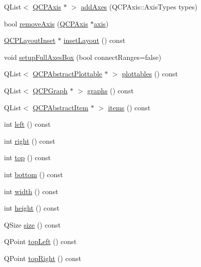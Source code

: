 \begin{DoxyCompactItemize}
\item 
Q\+List$<$ \hyperlink{classQCPAxis}{Q\+C\+P\+Axis} $\ast$ $>$ \hyperlink{classQCPAxisRect_a792e1f3d9cb1591fca135bb0de9b81fc}{add\+Axes} (Q\+C\+P\+Axis\+::\+Axis\+Types types)
\item 
bool \hyperlink{classQCPAxisRect_a03c39cd9704f0d36fb6cf980cdddcbaa}{remove\+Axis} (\hyperlink{classQCPAxis}{Q\+C\+P\+Axis} $\ast$\hyperlink{classQCPAxisRect_a560de44e47a4af0f86c59102a094b1e4}{axis})
\item 
\hyperlink{classQCPLayoutInset}{Q\+C\+P\+Layout\+Inset} $\ast$ \hyperlink{classQCPAxisRect_a4114887c7141b59650b7488f930993e5}{inset\+Layout} () const 
\item 
void \hyperlink{classQCPAxisRect_a5fa906175447b14206954f77fc7f1ef4}{setup\+Full\+Axes\+Box} (bool connect\+Ranges=false)
\item 
Q\+List$<$ \hyperlink{classQCPAbstractPlottable}{Q\+C\+P\+Abstract\+Plottable} $\ast$ $>$ \hyperlink{classQCPAxisRect_a5b0d629c8de5572945eeae79a142296e}{plottables} () const 
\item 
Q\+List$<$ \hyperlink{classQCPGraph}{Q\+C\+P\+Graph} $\ast$ $>$ \hyperlink{classQCPAxisRect_afa4ff90901d9275f670e24b40e3c1b25}{graphs} () const 
\item 
Q\+List$<$ \hyperlink{classQCPAbstractItem}{Q\+C\+P\+Abstract\+Item} $\ast$ $>$ \hyperlink{classQCPAxisRect_a0f17ed539962cfcbaca8ce0b1776c840}{items} () const 
\item 
int \hyperlink{classQCPAxisRect_a55b3ecf72a3a65b053f7651b88db458d}{left} () const 
\item 
int \hyperlink{classQCPAxisRect_a6d0f989fc552aa2b563cf82f8fc81e61}{right} () const 
\item 
int \hyperlink{classQCPAxisRect_ac45aef1eb75cea46b241b6303028a607}{top} () const 
\item 
int \hyperlink{classQCPAxisRect_af2b5982ebe7e6f781b9bf1cc371a60d8}{bottom} () const 
\item 
int \hyperlink{classQCPAxisRect_a45bf5c17f4ca29131b7eb0db06efc259}{width} () const 
\item 
int \hyperlink{classQCPAxisRect_a1c55c4f3bef40cf01b21820316c8469e}{height} () const 
\item 
Q\+Size \hyperlink{classQCPAxisRect_a871b9fe49e92b39a3cbe29a59e458536}{size} () const 
\item 
Q\+Point \hyperlink{classQCPAxisRect_a88acbe716bcf5072790a6f95637c40d8}{top\+Left} () const 
\item 
Q\+Point \hyperlink{classQCPAxisRect_a232409546394c23b59407bc62fa460a8}{top\+Right} () const 

\end{DoxyCompactItemize}
